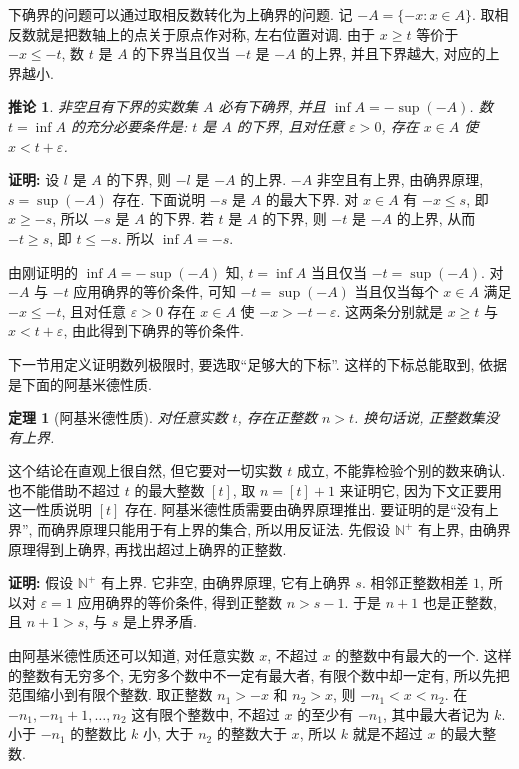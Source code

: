 \documentclass[UTF8,openany]{ctexbook}
\theoremstyle{chinesetextbook}
\newtheorem{theorem}{定理}[section]
\newenvironment{cnproof}{\par\indent\textbf{证明:} \ignorespaces}{\par}
\newtheorem*{corollarysingle}{推论}
\begin{document}
下确界的问题可以通过取相反数转化为上确界的问题. 记 $-A=\{-x:x\in A\}$. 取相反数就是把数轴上的点关于原点作对称, 左右位置对调. 由于 $x\ge t$ 等价于 $-x\le-t$, 数 $t$ 是 $A$ 的下界当且仅当 $-t$ 是 $-A$ 的上界, 并且下界越大, 对应的上界越小.
\begin{corollarysingle}
非空且有下界的实数集 $A$ 必有下确界, 并且 $\inf A=-\sup(-A)$. 数 $t=\inf A$ 的充分必要条件是: $t$ 是 $A$ 的下界, 且对任意 $\varepsilon>0$, 存在 $x\in A$ 使 $x<t+\varepsilon$.
\end{corollarysingle}
\begin{cnproof}
设 $l$ 是 $A$ 的下界, 则 $-l$ 是 $-A$ 的上界. $-A$ 非空且有上界, 由确界原理, $s=\sup(-A)$ 存在. 下面说明 $-s$ 是 $A$ 的最大下界. 对 $x\in A$ 有 $-x\le s$, 即 $x\ge-s$, 所以 $-s$ 是 $A$ 的下界. 若 $t$ 是 $A$ 的下界, 则 $-t$ 是 $-A$ 的上界, 从而 $-t\ge s$, 即 $t\le-s$. 所以 $\inf A=-s$.

由刚证明的 $\inf A=-\sup(-A)$ 知, $t=\inf A$ 当且仅当 $-t=\sup(-A)$. 对 $-A$ 与 $-t$ 应用确界的等价条件, 可知 $-t=\sup(-A)$ 当且仅当每个 $x\in A$ 满足 $-x\le-t$, 且对任意 $\varepsilon>0$ 存在 $x\in A$ 使 $-x>-t-\varepsilon$. 这两条分别就是 $x\ge t$ 与 $x<t+\varepsilon$, 由此得到下确界的等价条件.
\end{cnproof}
下一节用定义证明数列极限时, 要选取“足够大的下标”. 这样的下标总能取到, 依据是下面的阿基米德性质.
\begin{theorem}[阿基米德性质]
对任意实数 $t$, 存在正整数 $n>t$. 换句话说, 正整数集没有上界.
\end{theorem}
这个结论在直观上很自然, 但它要对一切实数 $t$ 成立, 不能靠检验个别的数来确认. 也不能借助不超过 $t$ 的最大整数 $[t]$, 取 $n=[t]+1$ 来证明它, 因为下文正要用这一性质说明 $[t]$ 存在. 阿基米德性质需要由确界原理推出. 要证明的是“没有上界”, 而确界原理只能用于有上界的集合, 所以用反证法. 先假设 $\mathbb N^+$ 有上界, 由确界原理得到上确界, 再找出超过上确界的正整数.
\begin{cnproof}
假设 $\mathbb N^+$ 有上界. 它非空, 由确界原理, 它有上确界 $s$. 相邻正整数相差 $1$, 所以对 $\varepsilon=1$ 应用确界的等价条件, 得到正整数 $n>s-1$. 于是 $n+1$ 也是正整数, 且 $n+1>s$, 与 $s$ 是上界矛盾.
\end{cnproof}
由阿基米德性质还可以知道, 对任意实数 $x$, 不超过 $x$ 的整数中有最大的一个. 这样的整数有无穷多个, 无穷多个数中不一定有最大者, 有限个数中却一定有, 所以先把范围缩小到有限个整数. 取正整数 $n_1>-x$ 和 $n_2>x$, 则 $-n_1<x<n_2$. 在 $-n_1,-n_1+1,\ldots,n_2$ 这有限个整数中, 不超过 $x$ 的至少有 $-n_1$, 其中最大者记为 $k$. 小于 $-n_1$ 的整数比 $k$ 小, 大于 $n_2$ 的整数大于 $x$, 所以 $k$ 就是不超过 $x$ 的最大整数.
\end{document}
